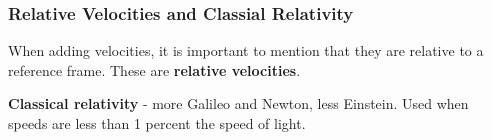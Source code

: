 \documentclass{article}
\begin{document}
\subsubsection{Relative Velocities and Classial Relativity}
When adding velocities, it is important to mention that they are relative to a reference frame. These are \textbf{relative velocities}.

\textbf{Classical relativity} - more Galileo and Newton, less Einstein. Used when speeds are less than 1 percent the speed of light.
\end{document}
